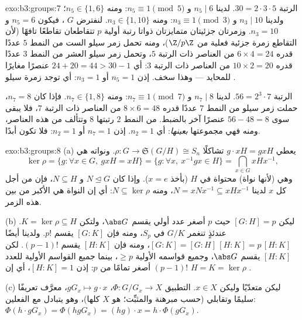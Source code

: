 \begin{solution}{exo:b3:groups:7}
الرتبة $30 = 2 \cdot 3 \cdot 5$. لدينا $n_5 \mid 6$ و $n_5 \equiv 1 \pmod
5$: ومنه $n_5 \in \{1, 6\}$؛ ولدينا
$n_3 \mid 10$ و $n_3 \equiv 1 \pmod 3$: ومنه $n_3 \in \{1, 10\}$. لنفترض $G$ ، فيكون
$n_5 = 6$ و $n_3 =
10$. وزمرتان جزئيتان متمايزتان ذواتا رتبة أولية
$p$ تتقاطعان تقاطعًا تافهًا (لأن التقاطع زمرة جزئية فعلية من
$\Z/p\Z$)، ومنه تحمل زمر سيلو الست من النمط $5$ عددًا قدره
$6 \times 4 = 24$ من العناصر ذات الرتبة $5$، وتحمل زمر سيلو العشر من النمط
$3$ عددًا قدره $10 \times 2 = 20$ من العناصر ذات الرتبة $3$: أي $24 + 20 = 44 > 30 - 1$ عنصرًا
مغايرًا للمحايد --- وهذا سخف. إذن $n_5 = 1$ أو $n_3 = 1$: أي توجد
زمرة سيلو .

الرتبة $56 = 2^3 \cdot 7$. لدينا $n_7 \mid 8$ و $n_7 \equiv 1 \pmod 7$: ومنه $n_7 \in \{1, 8\}$. فإذا كان
$n_7 = 8$، حملت زمر سيلو من النمط $7$ عددًا قدره $8
\times 6 = 48$ من
العناصر ذات الرتبة $7$، فلا يبقى سوى $56 - 48 =
8$ عنصرًا آخر بالضبط.
 من النمط $2$ رتبتها $8$ وتتألف من هذه العناصر،
ومنه فهي مجموعتها \emph{بعينها}: أي $n_2 = 1$. إذن $n_7 = 1$ أو
$n_2 = 1$: فلا تكون  أبدًا.
\end{solution}

\begin{solution}{exo:b3:groups:8}
(a) يعطي  $g \cdot xH = gxH$ تشاكلًا $\rho \colon G
\to \mathfrak S(G/H) \cong S_n$. ونواته هي
\[
\ker\rho = \{g : \forall x \in G,\ gxH = xH\}
= \{g : \forall x,\ x^{-1}gx \in H\}
= \bigcap_{x \in G} xHx^{-1},
\]
وهي  (لأنها نواة) محتواة في $H$ (بأخذ $x = e$).
وإذا كان $N \trianglelefteq G$ و $N \subseteq H$، فإن من أجل كل $x$ لدينا
$N
= xNx^{-1} \subseteq xHx^{-1}$، ومنه $N \subseteq \ker\rho$: أي إن النواة هي الأكبر من بين هذه الزمر.

(b) ليكن $[G:H] = p$ حيث $p$ أصغر عدد أولي يقسم $\abs G$، ولتكن
$K =
\ker\rho \subseteq H$. عندئذٍ تنغمر $G/K$ في $S_p$، ومنه فإن $[G:K]$ يقسم $p!$.
ولدينا أيضًا $[G:K] = [G:H]\,[H:K] = p\,[H:K]$، ومنه فإن $[H:K]$ يقسم $(p-1)!$. لكن
$[H:K]$ يقسم $\abs G$، وجميع قواسمه الأولية $\geq p$، بينما جميع
القواسم الأولية للعدد $(p-1)!$ أصغر تمامًا من $p$: إذن
$[H:K] = 1$، أي إن $H = K = \ker \rho$ .

(c) ليكن  متعدّيًا وليكن $x \in X$. التطبيق $\Phi
\colon G/G_x \to X$، $gG_x \mapsto g \cdot x$،
معرَّف تعريفًا سليمًا وتقابلي (حسب مبرهنة  والمثبِّت؛ 
هو $X$ كلها)، وهو يتبادل مع الفعلين: $\Phi(h \cdot gG_x) = \Phi(hgG_x) = (hg)
\cdot x = h \cdot \Phi(gG_x)$.
\end{solution}

